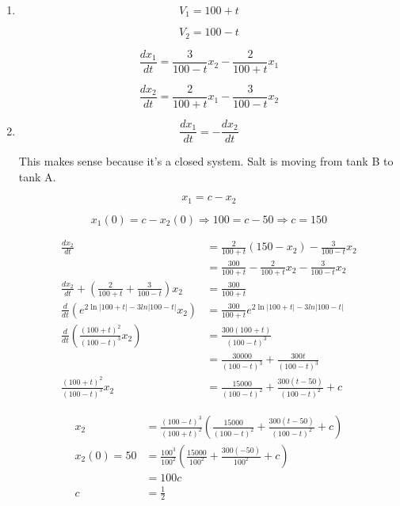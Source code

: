 \documentclass{article}
\begin{document}
\begin{enumerate}
  \item

        \[V_1 = 100 + t\]

        \[V_2 = 100 - t\]

        \[\frac{dx_1}{dt} = \frac{3}{100 - t} x_2 - \frac{2}{100 + t} x_1\]

        \[\frac{dx_2}{dt} = \frac{2}{100 + t} x_1 - \frac{3}{100 - t} x_2\]

  \item

        \[\frac{dx_1}{dt} = -\frac{dx_2}{dt}\]

        This makes sense because it's a closed system. Salt is moving from tank B to tank A.

        \[x_1 = c - x_2\]

        \[x_1(0) = c - x_2(0) \Rightarrow 100 = c - 50 \Rightarrow c = 150\]

        \begin{align*}
          \frac{dx_2}{dt}                                                            & = \frac{2}{100 + t} (150 - x_2) - \frac{3}{100 - t} x_2               \\
                                                                                     & = \frac{300}{100 + t} - \frac{2}{100 + t} x_2 - \frac{3}{100 - t} x_2 \\
          \frac{dx_2}{dt} + \left( \frac{2}{100 + t} + \frac{3}{100 - t} \right) x_2 & = \frac{300}{100 + t}                                                 \\
          \frac{d}{dt} (e^{2 \ln |100 + t| - 3 ln |100 - t|} x_2)                    & = \frac{300}{100 + t} e^{2 \ln |100 + t| - 3 ln |100 - t|}            \\
          \frac{d}{dt} \left( \frac{(100 + t)^2}{(100 - t)^3} x_2 \right)            & = \frac{300 (100 + t)}{(100 - t)^3}                                   \\
                                                                                     & = \frac{30000}{(100 - t)^3} + \frac{300 t}{(100 - t)^3}               \\
          \frac{(100 + t)^2}{(100 - t)^3} x_2                                        & = \frac{15000}{(100 - t)^2} + \frac{300 (t - 50)}{(100 - t)^2} + c
        \end{align*}

        \begin{align*}
          x_2         & = \frac{(100 - t)^3}{(100 + t)^2} \left( \frac{15000}{(100 - t)^2} + \frac{300 (t - 50)}{(100 - t)^2} + c \right) \\
          x_2(0) = 50 & = \frac{100^3}{100^2} \left( \frac{15000}{100^2} + \frac{300 (-50)}{100^2} + c \right)                            \\
                      & = 100 c                                                                                                           \\
          c           & = \frac{1}{2}
        \end{align*}


\end{enumerate}
\end{document}
